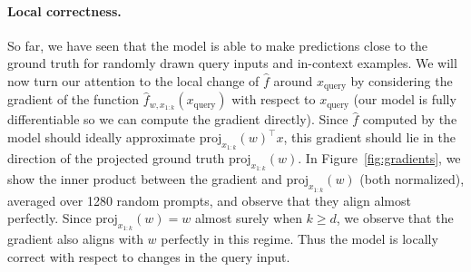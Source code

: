 \paragraph{Local correctness.} 
So far, we have seen that the model is able to make predictions close to the ground truth for randomly drawn query inputs and in-context examples.
We will now turn our attention to the local change of $\hat f$ around $x_\text{query}$ by considering the gradient of the function $\hat{f}_{w,  x_{1:k}}(x_{\text{query}})$ with respect to $x_{\text{query}}$ (our model is fully differentiable so we can compute the gradient directly).
Since $\hat{f}$ computed by the model should ideally approximate $\text{proj}_{x_{1:k}}(w)^\top x$, this gradient should lie in the direction of the projected ground truth $\text{proj}_{x_{1:k}}(w)$.
In Figure~\ref{fig:gradients}, we show the inner product  between the gradient and $\text{proj}_{x_{1:k}}(w)$ (both normalized),  averaged over 1280 random prompts, and observe that they align almost perfectly. Since $\text{proj}_{x_{1:k}}(w) = w$ almost surely when $k \geq d$, we observe that the gradient also aligns with $w$ perfectly in this regime. Thus the model is locally correct with respect to changes in the query input.